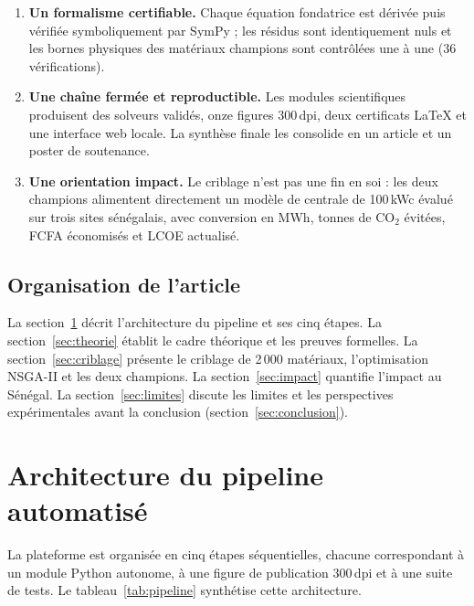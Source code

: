 \documentclass[11pt,a4paper,french]{article}
\begin{document}
\begin{enumerate}
  \item \textbf{Un formalisme certifiable.} Chaque équation fondatrice est dérivée puis vérifiée symboliquement par SymPy ; les résidus sont identiquement nuls et les bornes physiques des matériaux champions sont contrôlées une à une (36 vérifications).
  \item \textbf{Une chaîne fermée et reproductible.} Les modules scientifiques produisent des solveurs validés, onze figures 300\,dpi, deux certificats LaTeX et une interface web locale. La synthèse finale les consolide en un article et un poster de soutenance.
  \item \textbf{Une orientation impact.} Le criblage n'est pas une fin en soi : les deux champions alimentent directement un modèle de centrale de 100\,kWc évalué sur trois sites sénégalais, avec conversion en MWh, tonnes de CO$_2$ évitées, FCFA économisés et LCOE actualisé.
\end{enumerate}

\subsection{Organisation de l'article}

La section~\ref{sec:archi} décrit l'architecture du pipeline et ses cinq étapes. La section~\ref{sec:theorie} établit le cadre théorique et les preuves formelles. La section~\ref{sec:criblage} présente le criblage de 2\,000 matériaux, l'optimisation NSGA-II et les deux champions. La section~\ref{sec:impact} quantifie l'impact au Sénégal. La section~\ref{sec:limites} discute les limites et les perspectives expérimentales avant la conclusion (section~\ref{sec:conclusion}).

\section{Architecture du pipeline automatisé}
\label{sec:archi}

La plateforme est organisée en cinq étapes séquentielles, chacune correspondant à un module Python autonome, à une figure de publication 300\,dpi et à une suite de tests. Le tableau~\ref{tab:pipeline} synthétise cette architecture.
\end{document}
